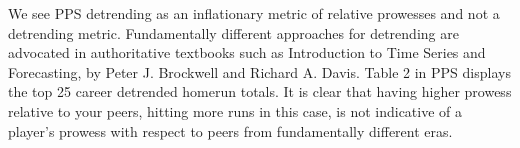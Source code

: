 \documentclass[11pt]{article}\usepackage[]{graphicx}\usepackage[]{color}
\begin{document}
We see PPS detrending as an inflationary metric of relative prowesses 
and not a detrending metric.  
Fundamentally different approaches for detrending are advocated in 
authoritative textbooks such as 
 Introduction to Time Series and Forecasting,
   by
 Peter J. Brockwell and Richard A. Davis.
Table 2 in PPS displays the top 25 career detrended homerun totals.  %
It is clear that having higher prowess relative to your peers, hitting more 
runs in this case, is not indicative of a player's prowess with respect to 
peers from fundamentally different eras.  




\end{document}
